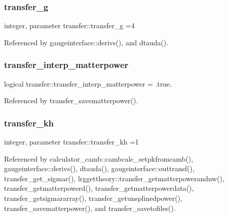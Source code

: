 \subsubsection{\texorpdfstring{transfer\+\_\+g}{transfer\_g}}
{\footnotesize\ttfamily integer, parameter transfer\+::transfer\+\_\+g =4}



Referenced by gaugeinterface\+::derivs(), and dtauda().

\mbox{\label{namespacetransfer_a1dfb4e8c94804bd740e5d676a5b23d6f}} 
\subsubsection{\texorpdfstring{transfer\+\_\+interp\+\_\+matterpower}{transfer\_interp\_matterpower}}
{\footnotesize\ttfamily logical transfer\+::transfer\+\_\+interp\+\_\+matterpower = .true.}



Referenced by transfer\+\_\+savematterpower().

\mbox{\label{namespacetransfer_a53e222aefb0911649bf35fc879a5f367}} 
\subsubsection{\texorpdfstring{transfer\+\_\+kh}{transfer\_kh}}
{\footnotesize\ttfamily integer, parameter transfer\+::transfer\+\_\+kh =1}



Referenced by calculator\+\_\+camb\+::cambcalc\+\_\+setpkfromcamb(), gaugeinterface\+::derivs(), dtauda(), gaugeinterface\+::outtransf(), transfer\+\_\+get\+\_\+sigmar(), lrggettheory\+::transfer\+\_\+getmatterpowerandnw(), transfer\+\_\+getmatterpowerd(), transfer\+\_\+getmatterpowerdata(), transfer\+\_\+getsigmararray(), transfer\+\_\+getunsplinedpower(), transfer\+\_\+savematterpower(), and transfer\+\_\+savetofiles().

\mbox{\label{namespacetransfer_ac87f6542d01968f20465ccd32f02667c}} 
